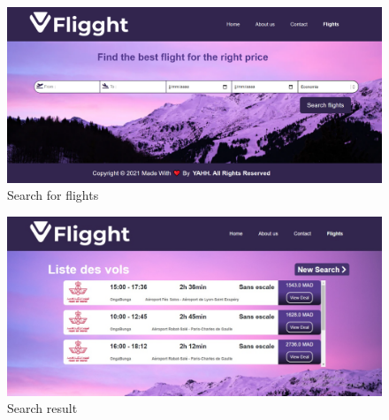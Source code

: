 \begin{figure}[htb!]
  \centering
\includegraphics[height=0.43\paperwidth,width=0.8\paperwidth]{Pictures/Search.png}
\caption{Search for flights}
\end{figure}
\FloatBarrier

\begin{figure}[htb!]
  \centering
\includegraphics[height=0.43\paperwidth,width=0.8\paperwidth]{Pictures/Result.jpeg}
\caption{Search result}
\end{figure}
\FloatBarrier
